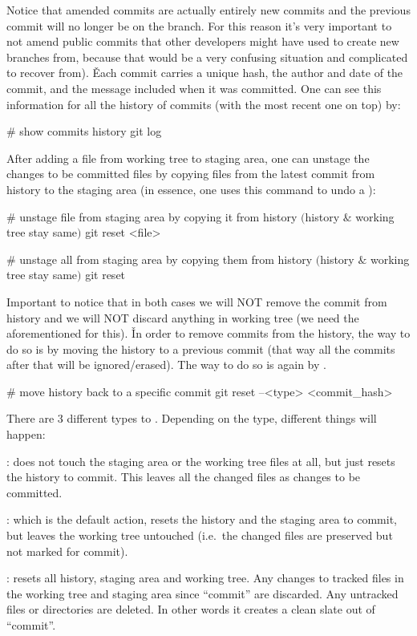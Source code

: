 Notice that amended commits are actually entirely new commits and the previous commit will no longer be on the branch.
For this reason it's very important to not amend public commits that other developers might have used to create new
branches from, because that would be a very confusing situation and complicated to recover from). \v

Each commit carries a unique hash, the author and date of the commit, and the message included when it was committed.
One can see this information for all the history of commits (with the most recent one on top) by:

\begin{bash}
# show commits history
git log
\end{bash}


After adding a file from working tree to staging area, one can unstage the changes to be committed files by copying
files from the latest commit from history to the staging area (in essence, one uses this command to undo a ):

\begin{bash}
# unstage file from staging area by copying it from history $($history $\&$ working tree stay same$)$
git reset <file>
\end{bash}

\begin{bash}
# unstage all from staging area by copying them from history $($history $\&$ working tree stay same$)$
git reset
\end{bash}


Important to notice that in both cases we will NOT remove the commit from history and we will NOT discard anything in
working tree (we need the aforementioned  for this). \v

In order to remove commits from the history, the way to do so is by moving the history to a previous commit (that way
all the commits after that will be ignored/erased). The way to do so is again by .

\begin{bash}
# move history back to a specific commit
git reset --<type> <commit_hash>
\end{bash}

There are 3 different types to . Depending on the type, different things will happen:
\bit
\item {}: does not touch the staging area or the working tree files at all, but just resets the history to
commit. This leaves all the changed files as changes to be committed.
\item {}: which is the default action, resets the history and the staging area to commit, but leaves the
working tree untouched (i.e.\ the changed files are preserved but not marked for commit).
\item {}: resets all history, staging area and working tree. Any changes to tracked files in the working
tree and staging area since ``commit'' are discarded. Any untracked files or directories are deleted. In other words
it creates a clean slate out of ``commit''.
\eit

